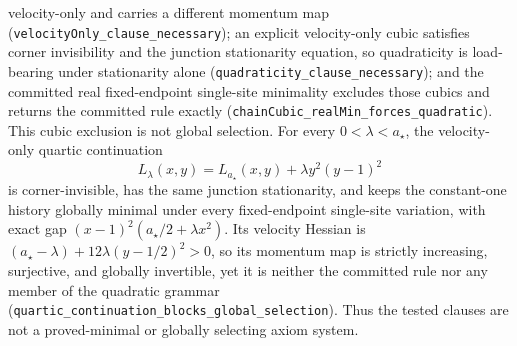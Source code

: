 \documentclass[11pt]{article}
\begin{document}
velocity-only and carries a different momentum map
(\texttt{velocityOnly\_clause\_necessary}); an explicit velocity-only
cubic satisfies corner invisibility and the junction stationarity
equation, so quadraticity is load-bearing under stationarity alone
(\texttt{quadraticity\_clause\_necessary}); and the committed real
fixed-endpoint single-site minimality excludes those cubics and returns
the committed rule exactly
(\texttt{chainCubic\_realMin\_forces\_quadratic}). This cubic exclusion is
not global selection. For every \(0<\lambda<a_\star\), the velocity-only
quartic continuation
\[
 L_\lambda(x,y)=L_{a_\star}(x,y)+\lambda y^2(y-1)^2
\]
is corner-invisible, has the same junction stationarity, and keeps the
constant-one history globally minimal under every fixed-endpoint single-site
variation, with exact gap
\((x-1)^2(a_\star/2+\lambda x^2)\). Its velocity Hessian is
\((a_\star-\lambda)+12\lambda(y-1/2)^2>0\), so its momentum map is strictly
increasing, surjective, and globally invertible, yet it is neither the
committed rule nor any member of the quadratic grammar
(\texttt{quartic\_continuation\_blocks\_global\_selection}). Thus the
tested clauses are not a proved-minimal or globally selecting axiom system.
\end{document}
